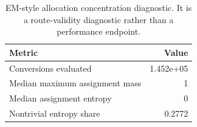\begin{table}
\caption{EM-style allocation concentration diagnostic. It is a route-validity diagnostic rather than a performance endpoint.}
\label{tab:app_exp2_em_assignment_diagnostic}
\begin{tabular}{lr}
\toprule
Metric & Value \\
\midrule
Conversions evaluated & 1.452e+05 \\
Median maximum assignment mass & 1 \\
Median assignment entropy & 0 \\
Nontrivial entropy share & 0.2772 \\
\bottomrule
\end{tabular}
\end{table}
